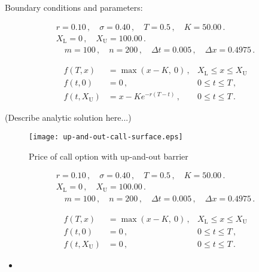 \documentclass[12pt]{article}
\newcommand{\XL}{X_\mathrm{L}}
\newcommand{\XU}{X_\mathrm{U}}
\begin{document}
Boundary conditions and parameters:

\begin{align*}
r = 0.10\,, \quad \sigma = 0.40\,, \quad T = 0.5\,, \quad K = 50.00\,.\\
\XL = 0\,, \quad \XU = 100.00\,. \\
\quad m = 100\,, \quad n = 200\,, \quad \Delta t = 0.005\,, \quad \Delta x = 0.4975\,.
\end{align*}

\begin{align*}
f(T, x) &= \max(x - K, \: 0)\,, & \XL \leq x \leq \XU \\
f(t, 0) &= 0\,, & 0 \leq t \leq T\,, \\
f(t, \XU) &= x - Ke^{-r(T-t)}\,, & 0 \leq t \leq T\,.
\end{align*}

(Describe analytic solution here...)

\begin{figure}
\texttt{[image: up-and-out-call-surface.eps]}
\caption{Price of call option with up-and-out barrier}
\end{figure}

\begin{align*}
r = 0.10\,, \quad \sigma = 0.40\,, \quad T = 0.5\,, \quad K = 50.00\,.\\
\XL = 0\,, \quad \XU = 100.00\,. \\
\quad m = 100\,, \quad n = 200\,, \quad \Delta t = 0.005\,, \quad \Delta x = 0.4975\,.
\end{align*}

\begin{align*}
f(T, x) &= \max(x - K, \: 0)\,, & \XL \leq x \leq \XU \\
f(t, 0) &= 0\,, & 0 \leq t \leq T\,, \\
f(t, \XU) &= 0\,, & 0 \leq t \leq T\,.
\end{align*}


\begin{itemize}
\item
{}
\end{itemize}

\end{document}
